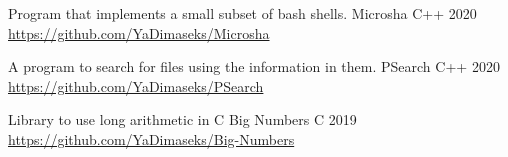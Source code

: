

\begin{cventries}

  \cventry
    {Program that implements a small subset of bash shells.} %
    {Microsha} %
    {C++} %
    {2020} %
    {
      \href{https://github.com/YaDimaseks/Microsha}{https://github.com/YaDimaseks/Microsha}
    }

\cventry
    {A program to search for files using the information in them.} %
    {PSearch} %
    {C++} %
    {2020} %
    {
      \href{https://github.com/YaDimaseks/PSearch}{https://github.com/YaDimaseks/PSearch}
    }

\cventry
    {Library to use long arithmetic in C} %
    {Big Numbers} %
    {C} %
    {2019} %
    {
      \href{https://github.com/YaDimaseks/Big-Numbers}{https://github.com/YaDimaseks/Big-Numbers}
    }

\end{cventries}
